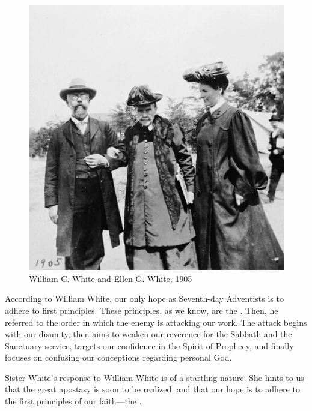 \begin{figure}
    \centering
    \includegraphics[width=1\linewidth]{images/william-ellen-white-1905.jpg}
    \caption*{William C. White and Ellen G. White, 1905}
    \label{fig:w-e-white}
\end{figure}

According to William White, our only hope as Seventh-day Adventists is to adhere to first principles. These principles, as we know, are the . Then, he referred to the order in which the enemy is attacking our work. The attack begins with our disunity, then aims to weaken our reverence for the Sabbath and the Sanctuary service, targets our confidence in the Spirit of Prophecy, and finally focuses on confusing our conceptions regarding personal God.

Sister White’s response to William White is of a startling nature. She hints to us that the great apostasy is soon to be realized, and that our hope is to adhere to the first principles of our faith—the .

 \\
 \\
 \\

